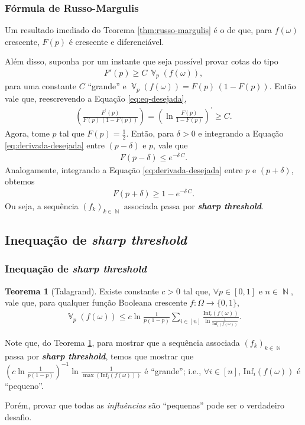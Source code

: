 \documentclass[9pt]{beamer}
\theoremstyle{definition} %
\newtheorem{mythm}{Teorema}
\DeclareMathOperator{\VX}{\mathbb{V}} %
\DeclareMathOperator{\NX}{\mathbb{N}} %
\newcommand{\infl}{\text{Inf}_i(f(\omega))}
\begin{document}
	\begin{frame}[t]
		\frametitle{Fórmula de Russo-Margulis}	
		Um resultado imediado do Teorema \ref{thm:russo-margulis} é o de que, para $f(\omega)$ crescente, $F(p)$ é crescente e diferenciável.
		
		Além disso, suponha por um instante que seja possível provar cotas do tipo
		\begin{align}\label{eq:eq-desejada}
		F'(p) \geq C \, \VX_p(f(\omega)),
		\end{align}
		para uma constante $C$ ``grande'' e $\VX_p(f(\omega)) = F(p) \, (1 - F(p))$. Então vale que, reescrevendo a Equação \ref{eq:eq-desejada},
		\begin{align}\label{eq:derivada-desejada}
		\left(\frac{F^{\prime}(p)}{F(p) \, (1 - F(p))}\right) = \left(\ln \frac{F(p)}{1 - F(p)}\right)^{\prime} \geq C.
		\end{align}
		\pause
		Agora, tome $p$ tal que $F(p) = \frac{1}{2}$. Então, para $\delta > 0$ e integrando a Equação \ref{eq:derivada-desejada} entre $(p - \delta)$ e $p$, vale que
		\begin{align*}
			F(p - \delta) \leq e^{-\delta \, C} .
		\end{align*}
		Analogamente, integrando a Equação \ref{eq:derivada-desejada} entre $p$ e $(p + \delta)$, obtemos
		\begin{align*}
			F(p + \delta) \geq 1 - e^{-\delta \, C}.
		\end{align*}
		Ou seja, a sequência $(f_k)_{k \in \NX}$ associada passa por \textit{\textbf{sharp threshold}}.
	\end{frame}

	\subsection{Inequação de \textit{\textbf{sharp threshold}}}
	\begin{frame}[t]
		\frametitle{Inequação de \textit{\textbf{sharp threshold}}}
		\begin{mythm}[Talagrand]\label{thm:talagrand}
			Existe constante $c > 0$ tal que, $\forall p \in [0,1]$ e $n \in \NX$, vale que, para qualquer função Booleana crescente $f: \Omega \to \{0,1\}$,
			\begin{align*}
			\VX_p(f(\omega)) \leq c \ln\frac{1}{p(1-p)} \sum_{i \in [n]} \frac{\infl}{\ln\frac{1}{\infl}}.
			\end{align*}
			\label{talagrand}
		\end{mythm}
		\vspace{-3pt}
		Note que, do Teorema \ref{thm:talagrand}, para mostrar que a sequência associada $(f_k)_{k\in\NX}$ passa por \textit{\textbf{sharp threshold}}, temos que mostrar que $\left(c \ln\frac{1}{p(1-p)}\right)^{-1}\ln\frac{1}{\max(\infl)}$ é ``grande''; i.e., $\forall i \in [n]$, $\infl$ é ``pequeno''.
		
		Porém, provar que todas as \textit{influências} são ``pequenas'' pode ser o verdadeiro desafio.
	\end{frame}
	
\end{document}
